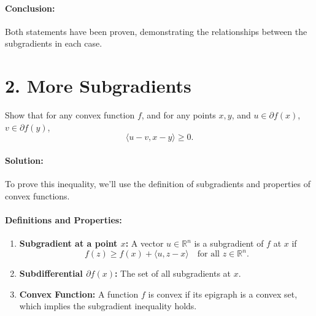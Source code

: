\documentclass{article}
\begin{document}
\paragraph{Conclusion:} Both statements have been proven, demonstrating the relationships between the subgradients in each case.

\section*{2. More Subgradients} Show that for any convex function $f$, and for any points $x, y$, and $u \in \partial f(x)$, $v \in \partial f(y)$,
\[\langle u - v, x - y \rangle \geq 0.\]

\paragraph{Solution:} To prove this inequality, we'll use the definition of subgradients and properties of convex functions.

\paragraph{Definitions and Properties:}
\begin{enumerate}
    \item \textbf{Subgradient at a point $x$:} A vector $u \in \mathbb{R}^n$ is a subgradient of $f$ at $x$ if
    \[f(z) \geq f(x) + \langle u, z - x \rangle \quad \text{for all } z \in \mathbb{R}^n.\]
    
    \item \textbf{Subdifferential $\partial f(x)$:} The set of all subgradients at $x$.
    
    \item \textbf{Convex Function:} A function $f$ is convex if its epigraph is a convex set, which implies the subgradient inequality holds.
\end{enumerate}
\end{document}
